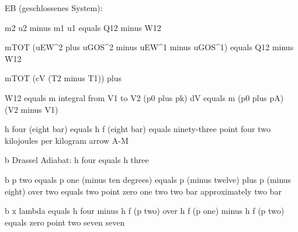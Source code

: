 EB (geschlossenes System):

m2 u2 minus m1 u1 equals Q12 minus W12

mTOT (uEW^2 plus uGOS^2 minus uEW^1 minus uGOS^1) equals Q12 minus W12

mTOT (cV (T2 minus T1)) plus

W12 equals m integral from V1 to V2 (p0 plus pk) dV equals m (p0 plus pA) (V2 minus V1)

h four (eight bar) equals h f (eight bar) equals ninety-three point four two kilojoules per kilogram  
arrow  
A-M  
  
b Drassel Adiabat: h four equals h three  
  
b p two equals p one (minus ten degrees) equals p (minus twelve) plus p (minus eight) over two equals two point zero one two two bar approximately two bar  
  
b x lambda equals h four minus h f (p two) over h f (p one) minus h f (p two) equals zero point two seven seven